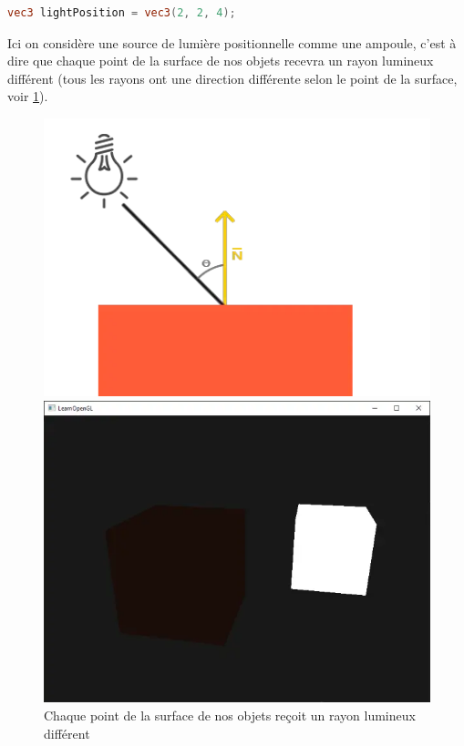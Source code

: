 \begin{minipage}{\linewidth}
\begin{lstlisting}[language=GLSL, caption=Position de la lumière avec un 
\lstinline{vec3}
,captionpos=b,frame=single]
vec3 lightPosition = vec3(2, 2, 4);
\end{lstlisting}
\end{minipage}

Ici on considère une source de lumière positionnelle comme une ampoule, c'est à dire que chaque point de la surface de nos objets recevra un rayon lumineux différent (tous les rayons ont une direction différente selon le point de la surface, voir \ref{diffuse00}).

\begin{figure}[h]
  \begin{minipage}[b]{0.45\linewidth}
    \centering
    \includegraphics[width=\linewidth]{images/shaders/diffuse00.png}
    \caption{Chaque point de la surface de nos objets reçoit un rayon lumineux différent}
    \label{diffuse00}
  \end{minipage}
  \hspace{0.1\linewidth} %
  \begin{minipage}[b]{0.45\linewidth}
    \centering
    \includegraphics[width=\linewidth]{images/shaders/ambiant00.png}

\end{minipage}
\end{figure}
